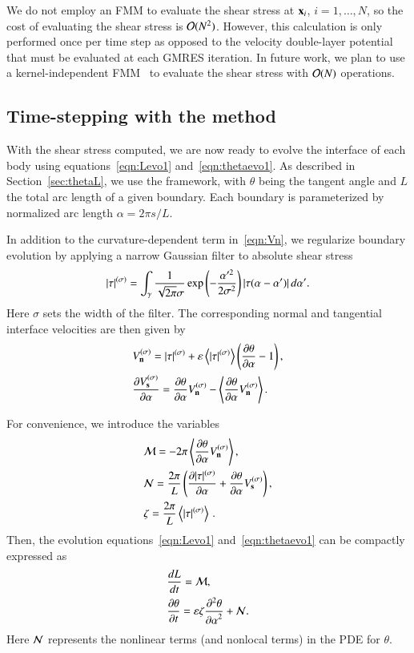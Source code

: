 \documentclass[preprint, 10pt]{elsarticle}
\begin{document}
We do not employ an FMM to evaluate the shear stress at ${\mathbf{x}}_i$,
$i=1,\ldots,N$, so the cost of evaluating the shear stress is
${\mathcal{O}}(N^2)$.  However, this calculation is only performed once per time
step as opposed to the velocity double-layer potential that must be
evaluated at each GMRES iteration.  In future work, we plan to use a
kernel-independent FMM~\cite{yin-bir-zor2004} to evaluate the shear
stress with ${\mathcal{O}}(N)$ operations.

\subsection{Time-stepping with the {\thL} method} 
\label{sec:timeStepping}

With the shear stress computed, we are now ready to evolve the interface
of each body using equations~\eqref{eqn:Levo1}
and~\eqref{eqn:thetaevo1}. As described in Section~\ref{sec:thetaL}, we
use the {\thL} framework, with $\theta$ being the tangent angle and $L$
the total arc length of a given boundary. Each boundary is
parameterized by normalized arc length $\alpha = 2 \pi s / L$.

In addition to the curvature-dependent term in~\eqref{eqn:Vn}, we regularize boundary evolution by applying a narrow Gaussian filter to absolute shear stress
\begin{align*}
\lvert \tau \rvert^{(\sigma)} = \int_{\gamma} \frac{1}{\sqrt{2\pi} \sigma} \exp \left(-
\frac{\alpha'^2}{2 \sigma^2}\right) \lvert  \tau(\alpha - \alpha')  \rvert \,
d\alpha'.
\end{align*}
Here $\sigma$ sets the width of the filter. The corresponding normal and tangential interface velocities are then given by
\begin{align*}
& V_{\mathbf{n}}^{(\sigma)} = \lvert \tau \rvert^{(\sigma)} +  \varepsilon \left< \lvert \tau \rvert^{(\sigma)} \right>
\left(\frac{\partial \theta}{\partial \alpha} - 1 \right), \\
& \frac{\partial V_{\mathbf{s}}^{(\sigma)}}{\partial \alpha} = \frac{\partial \theta}{\partial \alpha} V_{\mathbf{n}}^{(\sigma)} - \left< \frac{\partial \theta}{\partial \alpha} V_{\mathbf{n}}^{(\sigma)} \right>.
\end{align*}

For convenience, we introduce the variables
\begin{align*}
& \mathcal{M} = - 2 \pi \left< \frac{\partial \theta}{\partial \alpha} V_{\mathbf{n}}^{(\sigma)} \right>, \\
& \mathcal{N} = \frac{2 \pi}{L} \left( \frac{\partial \lvert \tau \rvert^{(\sigma)}}{\partial \alpha} + \frac{\partial \theta}{\partial \alpha}
V_{\mathbf{s}}^{(\sigma)} \right), \\
& \zeta = \frac{2 \pi}{L}  \left< \lvert \tau \rvert^{(\sigma)} \right> \, .
\end{align*}
Then, the evolution equations~\eqref{eqn:Levo1}
and~\eqref{eqn:thetaevo1} can be compactly expressed as
\begin{align}
\label{eqn:Levo2}
& \frac{d L}{d t} = \mathcal{M}, \\
\label{eqn:thetaevo2}
& \frac{\partial \theta}{\partial t} = \varepsilon \zeta \frac{\partial^2 \theta}{{\partial \alpha}^2} + \mathcal{N}.
\end{align}
Here $\mathcal{N}$ represents the nonlinear terms (and nonlocal terms) in
the PDE for $\theta$.  
\end{document}
